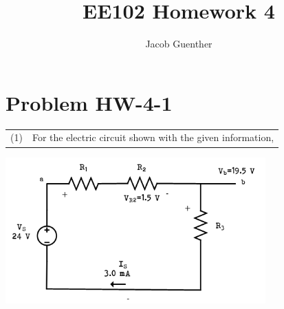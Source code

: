 \documentclass{article}
\title{EE102 Homework 4}
\author{Jacob Guenther}
\newcommand{\problemstatement}[3]{
\noindent
\begin{tabular}{ m{0.5cm} m{42em}}
	({#1}) & {#2}
\end{tabular}
}
\begin{document}


\section{Problem HW-4-1}
\problemstatement{1}{For the electric circuit shown with the given information,}{}
\begin{center}
	\includegraphics[width=10cm]{hw4_figure_1}
\end{center}
\end{document}
